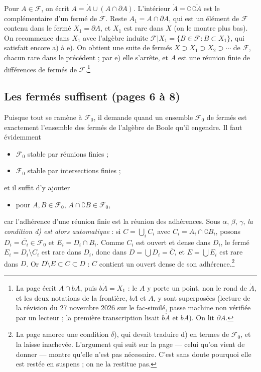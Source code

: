 \documentclass[11pt,a4paper]{article}
\begin{document}
Pour $A \in \mathcal{F}$, on écrit $A = \mathring{A} \cup (A \cap \partial A)$.
L'intérieur $\mathring{A} = \complement\, \overline{\complement A}$ est le
complémentaire d'un fermé de $\mathcal{F}$. Reste $A_1 = A \cap \partial A$,
qui est un élément de $\mathcal{F}$ contenu dans le fermé $X_1 = \partial A$, et
$X_1$ est rare dans $X$ (on le montre plus bas). On recommence dans $X_1$ avec
l'algèbre induite $\mathcal{F}|X_1 = \{ B \in \mathcal{F} : B \subset X_1 \}$,
qui satisfait encore a) à e). On obtient une suite de fermés $X \supset X_1
\supset X_2 \supset \cdots$ de $\mathcal{F}$, chacun rare dans le précédent ;
par e) elle s'arrête, et $A$ est une réunion finie de différences de fermés de
$\mathcal{F}$.\footnote{La page écrit $A \cap b\dot{A}$, puis $b\dot{A} =
X_1$ : le $A$ y porte un point, non le rond de $\mathring{A}$, et les deux
notations de la frontière, $bA$ et $\dot{A}$, y sont superposées (lecture de la
révision du 27 novembre 2026 sur le fac-similé, passe machine non vérifiée par
un lecteur ; la première transcription lisait $b\mathring{A}$ et $bA$). On lit
$\partial A$.}

\subsection*{Les fermés suffisent (pages 6 à 8)}

Puisque tout se ramène à $\mathcal{F}_0$, il demande quand un ensemble
$\mathcal{F}_0$ de fermés est exactement l'ensemble des fermés de l'algèbre de
Boole qu'il engendre. Il faut évidemment

\begin{itemize}
\item[$\alpha$)] $\mathcal{F}_0$ stable par réunions finies ;
\item[$\beta$)] $\mathcal{F}_0$ stable par intersections finies ;
\end{itemize}

et il suffit d'y ajouter

\begin{itemize}
\item[$\gamma$)] pour $A, B \in \mathcal{F}_0$, $\overline{A \cap \complement
  B} \in \mathcal{F}_0$,
\end{itemize}

car l'adhérence d'une réunion finie est la réunion des adhérences. Sous
$\alpha$, $\beta$, $\gamma$, \emph{la condition d) est alors automatique} : si
$C = \bigcup_i C_i$ avec $C_i = A_i \cap \complement B_i$, posons
$D_i = \overline{C_i} \in \mathcal{F}_0$ et $E_i = D_i \cap B_i$. Comme $C_i$
est ouvert et dense dans $D_i$, le fermé $E_i = D_i \setminus C_i$ est rare
dans $D_i$, donc dans $D = \bigcup D_i = \overline{C}$, et $E = \bigcup E_i$
est rare dans $D$. Or $D \setminus E \subset C \subset D$ : $C$ contient un
ouvert dense de son adhérence.\footnote{La page amorce une condition
$\delta$), qui devait traduire d) en termes de $\mathcal{F}_0$, et la laisse
inachevée. L'argument qui suit sur la page — celui qu'on vient de donner — montre
qu'elle n'est pas nécessaire. C'est sans doute pourquoi elle est restée en
suspens ; on ne la restitue pas.}
\end{document}

